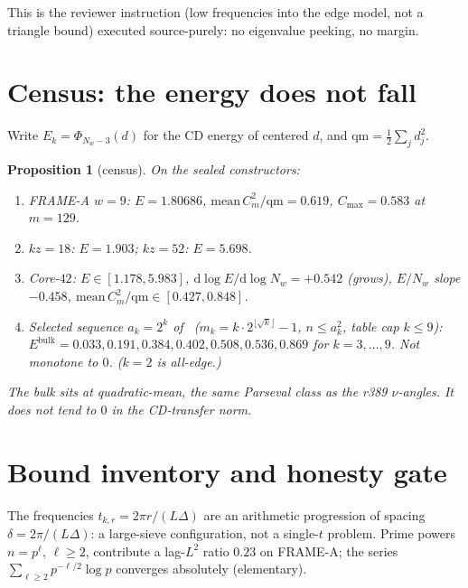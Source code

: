 \documentclass[11pt]{article}
\newtheorem{prop}{Proposition}
\theoremstyle{remark}
\begin{document}
This is the reviewer instruction (low frequencies into the
edge model, not a triangle bound) executed source-purely:
no eigenvalue peeking, no margin.

\section{Census: the energy does not fall}\label{sec:census}

Write $E_k=\Phi_{N_w-3}(d)$ for the CD energy of centered
$d$, and $\mathrm{qm}=\tfrac12\sum_j d_j^2$.

\begin{prop}[census]\label{prop:census}
On the sealed constructors:
\begin{enumerate}
\item FRAME-A $w=9$: $E=1.80686$,
$\mathrm{mean}\,C_m^2/\mathrm{qm}=0.619$, $C_{\max}=0.583$ at
$m=129$.
\item $kz=18$: $E=1.903$; $kz=52$: $E=5.698$.
\item Core-$42$: $E\in[1.178,5.983]$,
$\mathrm{d}\log E/\mathrm{d}\log N_w=+0.542$ (grows),
$E/N_w$ slope $-0.458$,
$\mathrm{mean}\,C_m^2/\mathrm{qm}\in[0.427,0.848]$.
\item Selected sequence $a_k=2^k$ of~\cite{r397}
($m_k=k\cdot 2^{\lfloor\sqrt k\rfloor}-1$, $n\le a_k^2$,
table cap $k\le 9$):
$E^{\mathrm{bulk}}=0.033,0.191,0.384,0.402,0.508,0.536,0.869$
for $k=3,\ldots,9$.  Not monotone to $0$.  ($k=2$ is all-edge.)
\end{enumerate}
The bulk sits at quadratic-mean, the same Parseval class as
the r389 $\nu$-angles.
It does not tend to $0$ in the CD-transfer norm.
\end{prop}

\section{Bound inventory and honesty gate}\label{sec:gate}

The frequencies $t_{k,r}=2\pi r/(L\Delta)$ are an arithmetic
progression of spacing $\delta=2\pi/(L\Delta)$: a large-sieve
configuration, not a single-$t$ problem.
Prime powers $n=p^\ell$, $\ell\ge 2$, contribute a lag-$L^2$
ratio $0.23$ on FRAME-A; the series
$\sum_{\ell\ge 2}p^{-\ell/2}\log p$ converges absolutely
(elementary).
\end{document}
